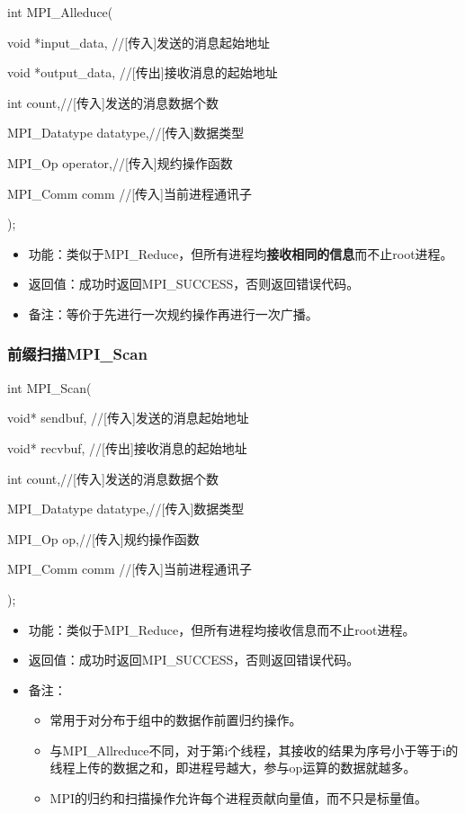\documentclass[UTF8]{article}%
\begin{document}
int MPI\_Alleduce(

    \qquad void *input\_data, //[传入]发送的消息起始地址

    \qquad void *output\_data, //[传出]接收消息的起始地址

    \qquad int count,//[传入]发送的消息数据个数

    \qquad MPI\_Datatype datatype,//[传入]数据类型

    \qquad MPI\_Op operator,//[传入]规约操作函数

    \qquad MPI\_Comm comm //[传入]当前进程通讯子
    
);

\begin{itemize}
    \item 功能：类似于MPI\_Reduce，但所有进程均\textbf{接收相同的信息}而不止root进程。
    \item 返回值：成功时返回MPI\_SUCCESS，否则返回错误代码。
    \item 备注：等价于先进行一次规约操作再进行一次广播。
\end{itemize}

\subsubsection{前缀扫描MPI\_Scan}

int MPI\_Scan(

    \qquad void* sendbuf, //[传入]发送的消息起始地址

    \qquad void* recvbuf, //[传出]接收消息的起始地址

    \qquad int count,//[传入]发送的消息数据个数

    \qquad MPI\_Datatype datatype,//[传入]数据类型

    \qquad MPI\_Op op,//[传入]规约操作函数

    \qquad MPI\_Comm comm //[传入]当前进程通讯子
    
);

\begin{itemize}
    \item 功能：类似于MPI\_Reduce，但所有进程均接收信息而不止root进程。
    \item 返回值：成功时返回MPI\_SUCCESS，否则返回错误代码。
    \item 备注：
    
    {
        \begin{itemize}
            \item 常用于对分布于组中的数据作前置归约操作。
            \item 与MPI\_Allreduce不同，对于第i个线程，其接收的结果为序号小于等于i的线程上传的数据之和，即进程号越大，参与op运算的数据就越多。
            \item MPI的归约和扫描操作允许每个进程贡献向量值，而不只是标量值。
        \end{itemize}
    }

\end{itemize}
\end{document}
